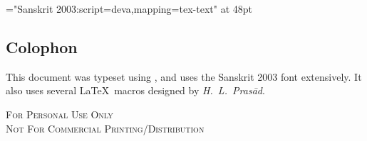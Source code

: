 
\thispagestyle{empty}
\thispagestyle{empty}\clearpage
\begin{titlepage}
\vspace*{6.5cm}
\begin{center}
{\font\x="Sanskrit 2003:script=deva,mapping=tex-text" at 48pt \x \titletext}
\end{center}
\end{titlepage}
\vspace*{5cm}
\begin{center}
\parbox{10cm}{\section*{Colophon}
\noindent This document was typeset using \XeLaTeX, and uses the Sanskrit 2003 font extensively. It also uses several \LaTeX\ macros designed by \textit{H.~L.~Prasād}.
\begin{center}
%
%
%
%
%
\vspace*{1cm}
%
{\scshape{For Personal Use Only\\
 Not For Commercial Printing/Distribution}}
\end{center}
}
\end{center}
\vspace*{5cm}
\clearemptydoublepage
\setcounter{page}{0}
\begin{center}
\begin{large}
\tableofcontents
\end{large}
\end{center}

\mbox{}
\clearpage
\thispagestyle{empty}
\clearemptydoublepage

